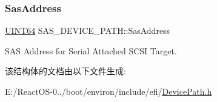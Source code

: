\subsubsection{\texorpdfstring{Sas\+Address}{SasAddress}}
{\footnotesize\ttfamily \hyperlink{_processor_bind_8h_a57be03562867144161c1bfee95ca8f7c}{U\+I\+N\+T64} S\+A\+S\+\_\+\+D\+E\+V\+I\+C\+E\+\_\+\+P\+A\+T\+H\+::\+Sas\+Address}

S\+AS Address for Serial Attached S\+C\+SI Target. 

该结构体的文档由以下文件生成\+:\begin{DoxyCompactItemize}
\item 
E\+:/\+React\+O\+S-\/0../boot/environ/include/efi/\hyperlink{_device_path_8h}{Device\+Path.\+h}\end{DoxyCompactItemize}
